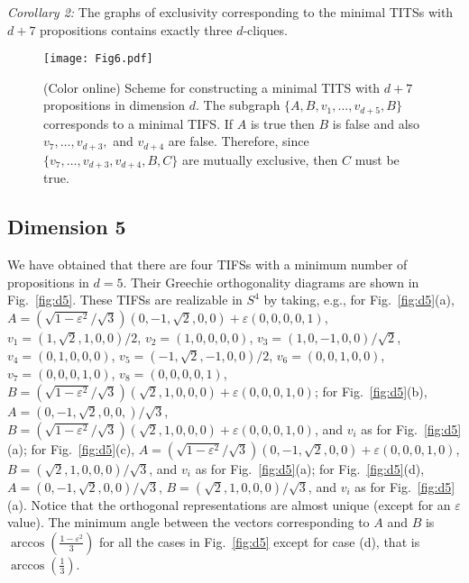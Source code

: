 \documentclass[%
 twocolumn,
 groupedaddress,
 showpacs,
 showkeys,
 preprintnumbers,
 amsmath,amssymb,
 aps,
 pra,
 longbibliography,
 floatfix,
 ]{revtex4-1}
\begin{document}

{\em Corollary 2:} The graphs of exclusivity corresponding to the minimal TITSs with $d+7$ propositions contains exactly three $d$-cliques.


\begin{figure}
\centerline{\texttt{[image: Fig6.pdf]}}
\caption{\label{fig:scheme}(Color online) Scheme for constructing a minimal TITS with $d+7$ propositions in dimension $d$. The subgraph $\{A,B,v_1,\dots,v_{d+5},B\}$ corresponds to a minimal TIFS. If $A$ is true then $B$ is false and also $v_7,\dots,v_{d+3},$ and $v_{d+4}$ are false. Therefore, since $\{v_7,\dots,v_{d+3},v_{d+4},B,C\}$ are mutually exclusive, then $C$ must be true.}
\end{figure}


\subsection{Dimension 5}


We have obtained that there are four TIFSs with a minimum number of propositions in $d=5$. Their Greechie orthogonality diagrams are shown in Fig.~\ref{fig:d5}.
These TIFSs are realizable in $S^4$ by taking,
		e.g., for Fig.~\ref{fig:d5}(a),
		$A = (\sqrt{1-\varepsilon^2} / \sqrt{3})({0,-1,\sqrt{2},0,0} )+\varepsilon({0,0,0,0,1})$,
		$v_1 = ({1,\sqrt{2},1,0,0} )/ 2 $,
		$v_2 = ({1,0,0,0,0} )$,
		$v_3 = ({1,0,-1,0,0} )/\sqrt{2}$,
		$v_4 = ({0,1,0,0,0} ) $,
		$v_5 = ({-1,\sqrt{2},-1,0,0} )/ 2$,
		$v_6 = ({0,0,1,0,0} ) $,
		$v_7 = ({0,0,0,1,0} )$,
		$v_{8} = ({0,0,0,0,1} )$,
		$B = (\sqrt{1-\varepsilon^2} / \sqrt{3}) ({\sqrt{2},1,0,0,0})+\varepsilon({0,0,0,1,0})$; for Fig.~\ref{fig:d5}(b),
		$A = ({0,-1,\sqrt{2},0,0,} )/\sqrt{3}$,
		$B = (\sqrt{1-\varepsilon^2} / \sqrt{3}) ({\sqrt{2},1,0,0,0})+\varepsilon({0,0,0,1,0})$,
		and $v_i$ as for Fig.~\ref{fig:d5}(a); for Fig.~\ref{fig:d5}(c),
		$A = (\sqrt{1-\varepsilon^2} / \sqrt{3})({0,-1,\sqrt{2},0,0} )+\varepsilon({0,0,0,1,0})$,
		$B = ({\sqrt{2},1,0,0,0} )/\sqrt{3}$, 
		and $v_i$ as for Fig.~\ref{fig:d5}(a); for Fig.~\ref{fig:d5}(d),
		$A = ({0,-1,\sqrt{2},0,0} )/\sqrt{3}$,
		$B = ({\sqrt{2},1,0,0,0} )/\sqrt{3}$, 
		and $v_i$ as for Fig.~\ref{fig:d5}(a).
		Notice that the orthogonal representations are almost unique (except for an $\varepsilon$ value). 
The minimum angle between the vectors corresponding to $A$ and $B$ is $\arccos\left(\frac{1-\varepsilon^2}{3}\right)$ for all the cases in Fig.~\ref{fig:d5} except for case (d), that is $\arccos\left(\frac{1}{3}\right)$.
\end{document}
